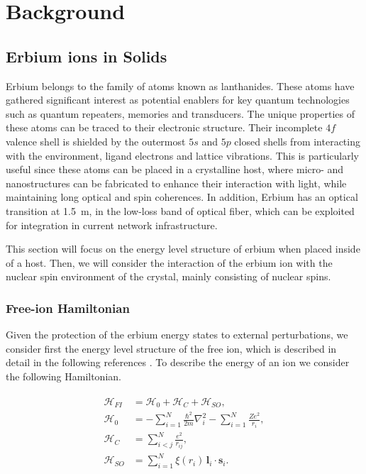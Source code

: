 \chapter{Background}

\section{Erbium ions in Solids}

Erbium belongs to the family of atoms known as lanthanides. These atoms have gathered significant interest as potential enablers for key quantum technologies such as quantum repeaters, memories and transducers. The unique properties of these atoms can be traced to their electronic structure. Their incomplete $4f$ valence shell is shielded by the outermost $5s$ and $5p$ closed shells from interacting with the environment, ligand electrons and lattice vibrations. This is particularly useful since these atoms can be placed in a crystalline host, where micro- and nanostructures can be fabricated to enhance their interaction with light, while maintaining long optical and spin coherences. In addition, Erbium has an optical transition at 1.5~\textmu m, in the low-loss band of optical fiber, which can be exploited for integration in current network infrastructure. 

This section will focus on the energy level structure of erbium when placed inside of a \Ca host. Then, we will consider the interaction of the erbium ion with the nuclear spin environment of the crystal, mainly consisting of \W nuclear spins. 

\subsection{Free-ion Hamiltonian}

Given the protection of the erbium energy states to external perturbations, we consider first the energy level structure of the free \Er ion, which is described in detail in the following references \cite{weissbluth_atoms_2012, abragam_electron_2012}. To describe the energy of an ion we consider the following Hamiltonian.

\begin{align}
\begin{split}
\mathcal{H}_{FI} &= \mathcal{H}_0 + \mathcal{H}_C + \mathcal{H}_{SO}, \\
\mathcal{H}_0 &= - \sum_{i=1}^N \frac{\hbar^2}{2m} \nabla_i^2 
- \sum_{i=1}^N \frac{Ze^2}{r_i}, \\
\mathcal{H}_C &= \sum_{i<j}^N \frac{e^2}{r_{ij}}, \\
\mathcal{H}_{SO} &= \sum_{i=1}^N \xi(r_i)\,\mathbf{l}_i \cdot \mathbf{s}_i.
\end{split}
\end{align}

